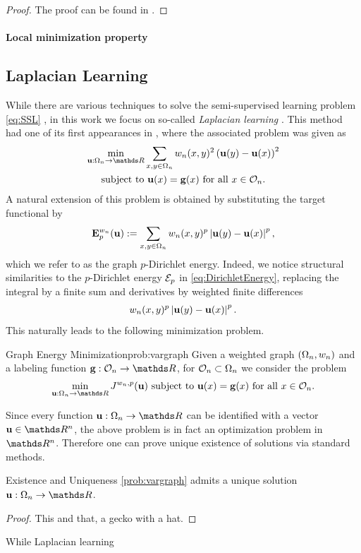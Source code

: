 %
%
\begin{proof}
The proof can be found in \cite[Thm. 2.16]{lindqvist2017notes}.
\end{proof}
%
%
\paragraph*{Local minimization property}
%
%
\subsection{Laplacian Learning}\label{sec:GpLap}
While there are various techniques to solve the semi-supervised learning problem \eqref{eq:SSL} \cite{}, 
in this work we 
focus on so-called \emph{Laplacian learning} \cite{belkin2006laplacian}. %
This method had one of its first appearances in 
\cite{zhu2003semi}, where the associated problem was given as
%
\begin{gather}\label{eq:SSL_Laplacian}
\begin{gathered}
\min_{\vec u:\domain_n\to\R} \sum_{x,y\in\domain_n} w_n(x,y)^2 
\left(\vec u(y) - \vec u(x) \right)^2\\
\text{subject to } \vec u(x) = \vec g(x) \text{ for all } x\in\conset_n.
\end{gathered}
\end{gather}
%
A natural extension of this problem is obtained by substituting the target functional by
%
\begin{align*}
\mathbf{E}^{w_n}_p(\mathbf{u}):= \sum_{x,y\in\Omega_n} w_n(x,y)^p \left|\mathbf{u}(y) - \mathbf{u}(x)\right|^p,
\end{align*}
%
which we refer to as the graph $p$-Dirichlet energy. Indeed, we notice structural 
similarities to the $p$-Dirichlet energy $\mathcal{E}_p$ in \cref{eq:DirichletEnergy}, replacing the integral by a finite 
sum and derivatives by weighted finite differences
%
\begin{align*}
 w_n(x,y)^p \left|\mathbf{u}(y) - \mathbf{u}(x)\right|^p.
\end{align*}
%
This naturally leads to the following minimization problem.
%
\begin{problem}{Graph Energy Minimization}{prob:vargraph}
Given a weighted graph $(\Omega_n, w_n)$ and a labeling function $\vec g:\conset_n\to\R$, for $\mathcal{O}_n\subset\Omega_n$ we consider 
the problem
%
\begin{align*}
\min_{\vec u:\domain_n\to\R} J^{w_n,p}(\vec u) \text{ subject to } \vec u(x) = \vec g(x) \text{ for all } x\in\conset_n.
\end{align*}
\end{problem}
%
\noindent%
Since every function $\vec u:\domain_n\to\R$ can be identified with a vector $\vec u\in\R^n$, the above problem 
is in fact an optimization problem in $\R^n$. Therefore one can prove unique existence of solutions via standard methods.
%
\begin{theorem}{Existence and Uniqueness}{}
\cref{prob:vargraph} admits a unique solution $\vec u:\domain_n\to\R$.
\end{theorem}
%
\begin{proof}
This and that, a gecko with a hat.
\end{proof}
%
While Laplacian learning 

